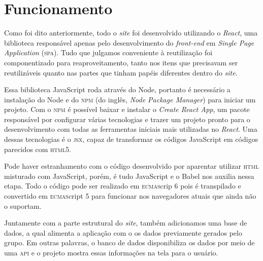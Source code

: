 \chapter{Funcionamento}
Como foi dito anteriormente, todo o \emph{site} foi desenvolvido utilizando o
\emph{React}, uma biblioteca responsável apenas pelo desenvolvimento do
\emph{front-end} em \emph{Single Page Application} (\textsc{spa}). Tudo que
julgamos conveniente à reutilização foi componentizado para reaproveitamento,
tanto nos itens que precisavam ser reutilizáveis quanto nas partes que tinham
papéis diferentes dentro do \emph{site}.

Essa biblioteca JavaScript roda através do Node, portanto é necessário a
instalação do Node e do \textsc{npm} (do inglês, \emph{Node Package Manager})
para iniciar um projeto. Com o \textsc{npm} é possível baixar e instalar o
\emph{Create React App}, um pacote responsável por configurar várias tecnologias
e trazer um projeto pronto para o desenvolvimento com todas as ferramentas
iniciais mais utilizadas no \emph{React}. Uma dessas tecnologias é o \textsc{jsx}, capaz de transformar os códigos JavaScript em códigos parecidos com \textsc{html5}.

Pode haver estranhamento com o código desenvolvido por aparentar utilizar
\textsc{html} misturado com JavaScript, porém, é tudo JavaScript e o Babel nos
auxilia nessa etapa. Todo o código pode ser realizado em \textsc{ecmas}crip 6 pois é transpilado e convertido em \textsc{ecmas}cript 5 para funcionar nos navegadores atuais que ainda não o suportam.

Juntamente com a parte estrutural do \emph{site}, também adicionamos uma base de dados, a qual alimenta a aplicação com o os dados previamente gerados pelo grupo. Em outras palavras, o banco de dados disponibiliza os dados por meio de uma \textsc{api} e o projeto mostra essas informações na tela para o usuário.
